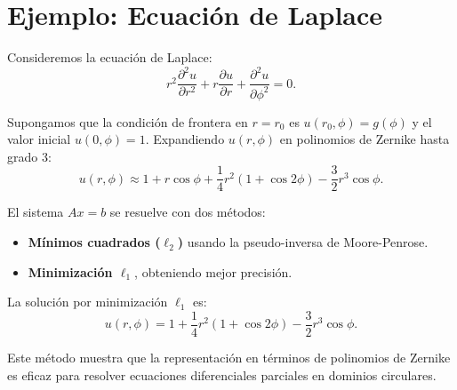 \documentclass{article}
\begin{document}
\section{Ejemplo: Ecuación de Laplace}

Consideremos la ecuación de Laplace:
\begin{equation}
    r^2 \frac{\partial^2 u}{\partial r^2} + r \frac{\partial u}{\partial r} + \frac{\partial^2 u}{\partial \phi^2} = 0.
\end{equation}

Supongamos que la condición de frontera en $ r = r_0 $ es $ u(r_0, \phi) = g(\phi) $ y el valor inicial $ u(0,\phi) = 1 $. Expandiendo $ u(r,\phi) $ en polinomios de Zernike hasta grado 3:
\begin{equation}
    u(r,\phi) \approx 1 + r \cos\phi + \frac{1}{4}r^2(1 + \cos 2\phi) - \frac{3}{2}r^3 \cos\phi.
\end{equation}

El sistema $ A x = b $ se resuelve con dos métodos:
\begin{itemize}
    \item \textbf{Mínimos cuadrados ($\ell_2$)} usando la pseudo-inversa de Moore-Penrose.
    \item \textbf{Minimización $\ell_1$}, obteniendo mejor precisión.
\end{itemize}

La solución por minimización $ \ell_1 $ es:
\begin{equation}
    u(r,\phi) = 1 + \frac{1}{4} r^2 (1 + \cos 2\phi) - \frac{3}{2} r^3 \cos\phi.
\end{equation}

Este método muestra que la representación en términos de polinomios de Zernike es eficaz para resolver ecuaciones diferenciales parciales en dominios circulares.
\end{document}
